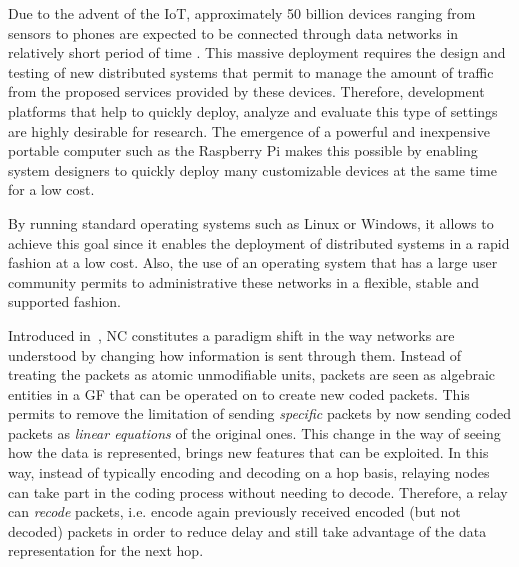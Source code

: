 %

Due to the advent of the \ac{IoT}, approximately 50 billion devices
ranging from sensors to phones are expected to be connected through
data networks in relatively short period of time \cite{cisco2011forecast}.
This massive deployment requires the design and testing of new
distributed systems that permit to manage the amount of traffic
from the proposed services provided by these devices. Therefore,
development platforms that help to quickly deploy, analyze and
evaluate this type of settings are highly desirable for research.
The emergence of a powerful and inexpensive portable computer such
as the Raspberry Pi makes this possible by enabling system designers
to quickly deploy many customizable devices at the same time
for a low cost.

By running standard operating systems such as
Linux or Windows, it allows to achieve this goal since it enables the
deployment of distributed systems in a rapid fashion at a low cost.
Also, the use of an operating system that has a large user community
permits to administrative these networks in a flexible, stable and
supported fashion.

Introduced in~\cite{ahlswede2000network}, \ac{NC}
constitutes a paradigm shift in the way networks are understood
by changing how information is sent through them.
Instead of treating the packets as atomic
unmodifiable units, packets are seen as algebraic entities in a \ac{GF}
that can be operated on to create new coded packets. This permits to
remove the limitation of sending \textit{specific} packets by now sending
coded packets as \textit{linear equations} of the original ones. This
change in the way of seeing how the data is represented, brings new
features that can be exploited. In this way, instead of typically encoding
and decoding on a hop basis, relaying nodes can take part in the
coding process without needing to decode. Therefore, a relay can
\textit{recode} packets, i.e. encode again previously received encoded
(but not decoded) packets in order to reduce delay and still
take advantage of the data representation for the next hop.


